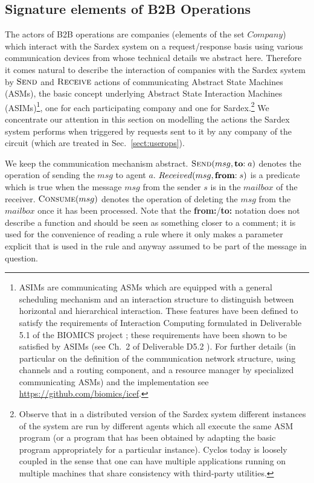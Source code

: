 \subsection{Signature elements of B2B Operations}
\label{signaturepaymtop}
The actors of B2B operations are companies (elements of the set $Company$) which interact with the Sardex system on a request/response basis using various communication devices from whose technical details we abstract here. Therefore it comes natural to describe the interaction of companies with the Sardex system by $\hbox{\sc Send}$ and $\hbox{\sc Receive}$ actions of communicating Abstract State Machines (ASMs), the basic concept underlying Abstract State Interaction Machines (ASIMs)\footnote{ASIMs are communicating ASMs which are equipped with a general scheduling mechanism and an interaction structure to distinguish between horizontal and hierarchical interaction. These features have been defined to satisfy the requirements of Interaction Computing formulated in Deliverable 5.1 of the BIOMICS project  \cite{BIOMICSD51}; these requirements have been shown to be satisfied by ASIMs (see Ch.\ 2 of Deliverable D5.2 \cite{BIOMICSD52}). For further details (in particular on the definition of the communication network structure, using channels and a routing component, and a resource manager by specialized communicating ASMs) and the implementation see \url{https://github.com/biomics/icef}.}, one for each participating company and one for Sardex.\footnote{Observe that in a distributed version of the Sardex system different instances of the system are run by different agents which all execute the same ASM program (or a program that has been obtained by adapting the basic program appropriately for a particular instance). Cyclos today is loosely coupled in the sense that one can have multiple applications running on multiple machines that share consistency with third-party utilities.} We concentrate our attention in this section on modelling the actions the Sardex system performs when triggered by requests sent to it by any company of the circuit (which are treated in Sec.~\ref{sect:userops}).

We keep the communication mechanism abstract. $\hbox{\sc Send}(msg,\mathrel{\mathbf{to}} :a)$ denotes the operation of sending the $msg$ to agent $a$. $Received(msg,\mathrel{\mathbf{from}} :s)$ is a predicate which is true when the message $msg$ from the sender $s$ is in the $mailbox$ of the receiver. $\hbox{\sc Consume}(msg)$ denotes the operation of deleting the $msg$ from the $mailbox$ once it has been processed. Note that the \textbf{from:}/\textbf{to:} notation does not describe a function and should be seen as something closer to a comment; it is used for the convenience of reading a rule where it only makes a parameter explicit that is used in the rule and anyway assumed to be part of the message in question.

